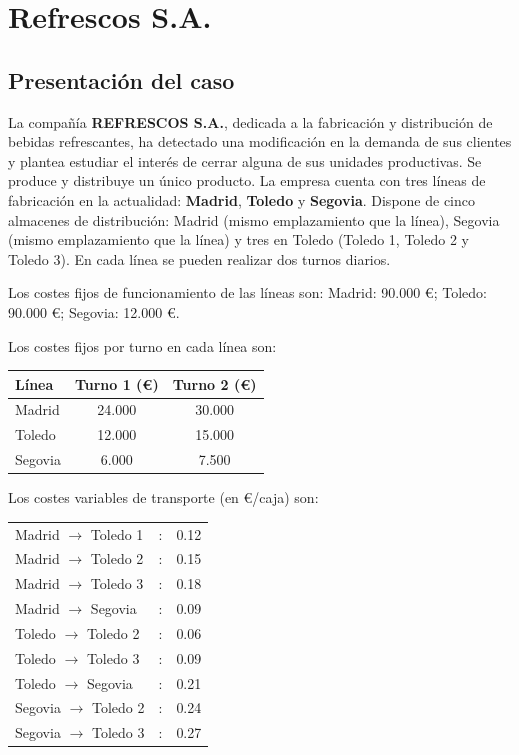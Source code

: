 \section{Refrescos S.A.}


\subsection{Presentación del caso}

La compañía \textbf{REFRESCOS S.A.}, dedicada a la fabricación y distribución de bebidas refrescantes, ha detectado una modificación en la demanda de sus clientes y plantea estudiar el interés de cerrar alguna de sus unidades productivas.  
Se produce y distribuye un único producto.  
La empresa cuenta con tres líneas de fabricación en la actualidad: \textbf{Madrid}, \textbf{Toledo} y \textbf{Segovia}.  
Dispone de cinco almacenes de distribución: Madrid (mismo emplazamiento que la línea), Segovia (mismo emplazamiento que la línea) y tres en Toledo (Toledo 1, Toledo 2 y Toledo 3).  
En cada línea se pueden realizar dos turnos diarios.  

Los costes fijos de funcionamiento de las líneas son:  
Madrid: 90.000 €; Toledo: 90.000 €; Segovia: 12.000 €.  

Los costes fijos por turno en cada línea son:

\begin{center}
\begin{tabular}{lcc}
\toprule
Línea & Turno 1 (€) & Turno 2 (€) \\
\midrule
Madrid & 24.000 & 30.000 \\
Toledo & 12.000 & 15.000 \\
Segovia & 6.000 & 7.500 \\
\bottomrule
\end{tabular}
\end{center}

Los costes variables de transporte (en €/caja) son:

\begin{center}
\begin{tabular}{lcl}
Madrid $\rightarrow$ Toledo 1 & : & 0.12 \\
Madrid $\rightarrow$ Toledo 2 & : & 0.15 \\
Madrid $\rightarrow$ Toledo 3 & : & 0.18 \\
Madrid $\rightarrow$ Segovia & : & 0.09 \\
Toledo $\rightarrow$ Toledo 2 & : & 0.06 \\
Toledo $\rightarrow$ Toledo 3 & : & 0.09 \\
Toledo $\rightarrow$ Segovia & : & 0.21 \\
Segovia $\rightarrow$ Toledo 2 & : & 0.24 \\
Segovia $\rightarrow$ Toledo 3 & : & 0.27 \\
\end{tabular}
\end{center}

